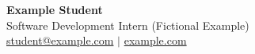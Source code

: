 \begin{center}
  \textbf{\Huge Example Student} \\[5pt]
  Software Development Intern (Fictional Example) \\[3pt]
  \href{mailto:student@example.com}{student@example.com} $|$ \href{https://example.com}{example.com}
\end{center}
